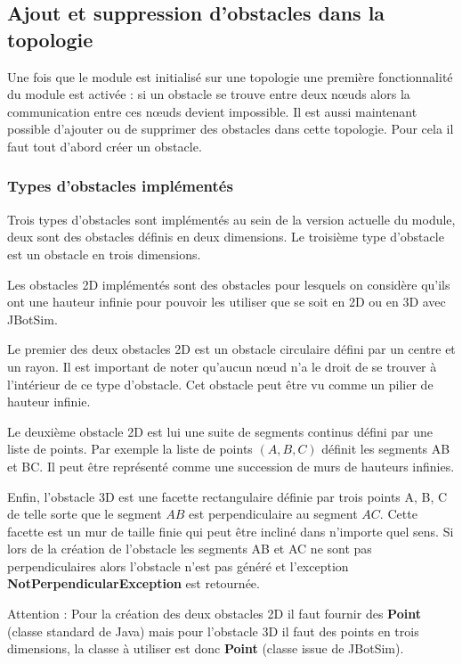 \documentclass{article}
\begin{document}
\subsection{Ajout et suppression d'obstacles dans la topologie}
Une fois que le module est initialisé sur une topologie une première fonctionnalité du module est activée : si un obstacle se trouve entre deux n\oe uds alors la communication entre ces n\oe uds devient impossible. Il est aussi maintenant possible d'ajouter ou de supprimer des obstacles dans cette topologie. Pour cela il faut tout d'abord créer un obstacle. 

\subsubsection{Types d'obstacles implémentés}
Trois types d'obstacles sont implémentés au sein de la version actuelle du module, deux sont des obstacles définis en deux dimensions. Le troisième type d'obstacle est un obstacle en trois dimensions.\medskip

Les obstacles 2D implémentés sont des obstacles pour lesquels on considère qu'ils ont une hauteur infinie pour pouvoir les utiliser que se soit en 2D ou en 3D avec JBotSim.\medskip

Le premier des deux obstacles 2D est un obstacle circulaire défini par un centre et un rayon. Il est important de noter qu'aucun n\oe ud n'a le droit de se trouver à l'intérieur de ce type d'obstacle. Cet obstacle peut être vu comme un pilier de hauteur infinie.\medskip

Le deuxième obstacle 2D est lui une suite de segments continus défini par une liste de points. Par exemple la liste de points $(A,B,C)$ définit les segments AB et BC. Il peut être représenté comme une succession de murs de hauteurs infinies.\medskip

Enfin, l'obstacle 3D est une facette rectangulaire définie par trois points A, B, C de telle sorte que le segment $AB$ est perpendiculaire au segment $AC$. Cette facette est un mur de taille finie qui peut être incliné dans n'importe quel sens. Si lors de la création de l'obstacle les segments AB et AC ne sont pas perpendiculaires alors l'obstacle n'est pas généré et l'exception \textbf{NotPerpendicularException} est retournée.\medskip

Attention : Pour la création des deux obstacles 2D il faut fournir des \textbf{Point} (classe standard de Java)  mais pour l'obstacle 3D il faut des points en trois dimensions, la classe à utiliser est donc \textbf{Point} (classe issue de JBotSim).\\%
\end{document}
